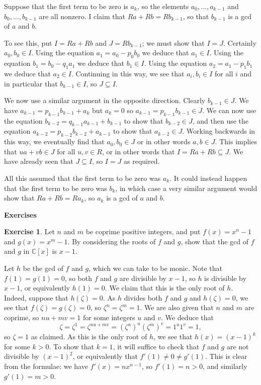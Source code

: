 \documentclass{amsart}
\newcommand{\C}         {{\mathbb{C}}}
\newcommand{\zt}        {\zeta}
\newcommand{\sse}       {\subseteq}
\newcommand{\ip}[1]     {\langle #1\rangle}
\renewcommand{\:}{\colon}
\theoremstyle{definition}
\newtheorem{exercise}{Exercise}[section]
\renewenvironment{solution}{\SolutionAtEnd}{\endSolutionAtEnd}
\begin{document}
Suppose that the first term to be zero is $a_k$, so the elements
$a_0,\ldots,a_{k-1}$ and $b_0,\ldots,b_{k-1}$ are all nonzero.  I
claim that $Ra+Rb=Rb_{k-1}$, so that $b_{k-1}$ is a gcd of $a$ and
$b$.  

To see this, put $I=Ra+Rb$ and $J=Rb_{k-1}$; we must show that $I=J$.
Certainly $a_0,b_0\in I$.  Using the equation $a_1=a_0-p_0b_0$ we
deduce that $a_1\in I$.  Using the equation $b_1=b_0-q_1a_1$ we deduce
that $b_1\in I$.  Using the equation $a_2=a_1-p_1b_1$ we deduce that
$a_2\in I$.  Continuing in this way, we see that $a_i,b_i\in I$ for
all $i$ and in particular that $b_{k-1}\in I$, so $J\sse I$.

We now use a similar argument in the opposite direction.  Clearly
$b_{k-1}\in J$.  We have $a_{k-1}=p_{k-1}b_{k-1}+a_k$ but $a_k=0$ so
$a_{k-1}=p_{k-1}b_{k-1}\in J$.  We can now use the equation
$b_{k-2}=q_{k-1}a_{k-1}+b_{k-1}$ to show that $b_{k-2}\in J$, and then
use the equation $a_{k-2}=p_{k-2}b_{k-2}+a_{k-1}$ to show that
$a_{k-2}\in J$.  Working backwards in this way, we eventually find
that $a_0,b_0\in J$ or in other words $a,b\in J$.  This implies that
$ua+vb\in J$ for all $u,v\in R$, or in other words that 
$I=Ra+Rb\sse J$.  We have already seen that $J\sse I$, so $I=J$ as
required.  

All this assumed that the first term to be zero was $a_k$.  It could
instead happen that the first term to be zero was $b_k$, in which case
a very similar argument would show that $Ra+Rb=Ra_k$, so $a_k$ is a
gcd of $a$ and $b$.


\begin{center}
 \Large \textbf{Exercises}
\end{center}

\begin{exercise}
 Let $n$ and $m$ be coprime positive integers, and put $f(x)=x^n-1$ and
 $g(x)=x^m-1$.  By considering the roots of $f$ and $g$, show that the
 gcd of $f$ and $g$ in $\C[x]$ is $x-1$.
\end{exercise}
\begin{solution}
 Let $h$ be the gcd of $f$ and $g$, which we can take to be monic.
 Note that $f(1)=g(1)=0$, so both $f$ and $g$ are divisible by $x-1$,
 so $h$ is divisible by $x-1$, or equivalently $h(1)=0$.  We claim
 that this is the only root of $h$.  Indeed, suppose that $h(\zt)=0$.
 As $h$ divides both $f$ and $g$ and $h(\zt)=0$, we see that
 $f(\zt)=g(\zt)=0$, so $\zt^n=\zt^m=1$.  We are also given that $n$
 and $m$ are coprime, so $nu+mv=1$ for some integers $u$ and $v$.  We
 deduce that
 \[ \zt = \zt^1 = \zt^{nu+mv} = (\zt^n)^u (\zt^m)^v = 1^u 1^v = 1, \]
 so $\zt=1$ as claimed.  As this is the only root of $h$, we see that
 $h(x)=(x-1)^k$ for some $k>0$.  To show that $k=1$, it will suffice
 to check that $f$ and $g$ are not divisible by $(x-1)^2$, or
 equivalently that $f'(1)\neq 0\neq g'(1)$.  This is clear from the
 formulae: we have $f'(x)=nx^{n-1}$, so $f'(1)=n>0$, and similarly
 $g'(1)=m>0$. 
\end{solution}
\end{document}
